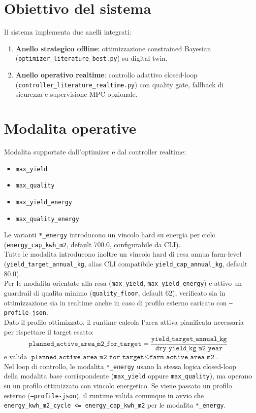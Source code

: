 ﻿\documentclass[11pt,a4paper]{report}
\begin{document}
\section{Obiettivo del sistema}
Il sistema implementa due anelli integrati:
\begin{enumerate}
  \item \textbf{Anello strategico offline}: ottimizzazione constrained Bayesian (\texttt{optimizer\_literature\_best.py}) su digital twin.
  \item \textbf{Anello operativo realtime}: controllo adattivo closed-loop (\texttt{controller\_literature\_realtime.py}) con quality gate, fallback di sicurezza e supervisione MPC opzionale.
\end{enumerate}

\section{Modalita operative}
Modalita supportate dall'optimizer e dal controller realtime:
\begin{itemize}
  \item \texttt{max\_yield}
  \item \texttt{max\_quality}
  \item \texttt{max\_yield\_energy}
  \item \texttt{max\_quality\_energy}
\end{itemize}
Le varianti \texttt{*\_energy} introducono un vincolo hard su energia per ciclo
(\texttt{energy\_cap\_kwh\_m2}, default 700.0, configurabile da CLI).\\
Tutte le modalita introducono inoltre un vincolo hard di resa annua farm-level
(\texttt{yield\_target\_annual\_kg}, alias CLI compatibile \texttt{yield\_cap\_annual\_kg}, default 80.0).\\
Per le modalita orientate alla resa (\texttt{max\_yield}, \texttt{max\_yield\_energy}) e attivo un guardrail
di qualita minimo (\texttt{quality\_floor}, default 62), verificato sia in ottimizzazione sia in realtime
anche in caso di profilo esterno caricato con \texttt{--profile-json}.\\
Dato il profilo ottimizzato, il runtime calcola l'area attiva pianificata necessaria per rispettare il target esatto:
\[
\texttt{planned\_active\_area\_m2\_for\_target} =
\frac{\texttt{yield\_target\_annual\_kg}}{\texttt{dry\_yield\_kg\_m2\_year}}
\]
e valida \(\texttt{planned\_active\_area\_m2\_for\_target} \le \texttt{farm\_active\_area\_m2}\).\\
Nel loop di controllo, le modalita \texttt{*\_energy} usano la stessa logica closed-loop della modalita base corrispondente
(\texttt{max\_yield} oppure \texttt{max\_quality}), ma operano su un profilo ottimizzato con vincolo energetico.
Se viene passato un profilo esterno (\texttt{--profile-json}), il runtime valida comunque in avvio che
\texttt{energy\_kwh\_m2\_cycle <= energy\_cap\_kwh\_m2} per le modalita \texttt{*\_energy}.
\end{document}
